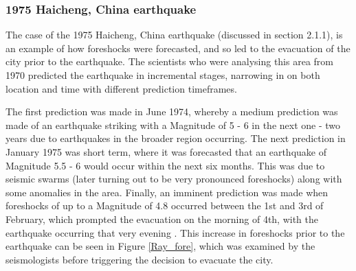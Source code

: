 \documentclass[12pt]{report}
\begin{document}


\subsubsection{1975 Haicheng, China earthquake}
The case of the 1975 Haicheng, China earthquake (discussed in section 2.1.1), is an example of how foreshocks were forecasted, and so led to the evacuation of the city prior to the earthquake. The scientists who were analysing this area from 1970 predicted the earthquake in incremental stages, narrowing in on both location and time with different prediction timeframes. 

The first prediction was made in June 1974, whereby a medium prediction was made of an earthquake striking with a Magnitude of 5 - 6 in the next one - two years due to earthquakes in the broader region occurring. The next prediction in January 1975 was short term, where it was forecasted that an earthquake of Magnitude 5.5 - 6 would occur within the next six months. This was due to seismic swarms (later turning out to be very pronounced foreshocks) along with some anomalies in the area. Finally, an imminent prediction was made when foreshocks of up to a Magnitude of 4.8 occurred between the 1st and 3rd of February, which prompted the evacuation on the morning of 4th, with the earthquake occurring that very evening \citep{Raleigh1977, Wang2006, Chen2010}. This increase in foreshocks prior to the earthquake can be seen in Figure \ref{Ray_fore}, which was examined by the seismologists before triggering the decision to evacuate the city. 
\end{document}
